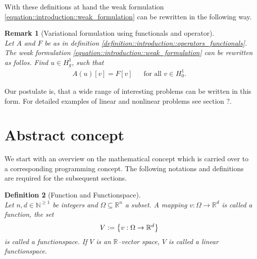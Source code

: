 \documentclass[a4paper,11pt]{article}
\numberwithin{equation}{section}
\newtheorem{definition}{Definition}[section]
\newtheorem{remark}[definition]{Remark}
\newcommand{\theoremNewline}{\hspace{1mm}\\}
\newcommand{\theoremEndLine}{\hspace{1mm}}
\newcommand{\punkt}{\text{.}}
\newcommand{\N}{\mathbb{N}}
\newcommand{\R}{\mathbb{R}}
\begin{document}
    With these definitions at hand the weak formulation \eqref{equation::introduction::weak_formulation} can be
    rewritten in the following way.

    \begin{remark}[Variational formulation using functionals and operator]\theoremNewline
      \label{remakr::introduction::variational_formulation_functionals_operators}
      Let $A$ and $F$ be as in definition \ref{definition::introduction::operators_functionals}. The weak formulation
      \eqref{equation::introduction::weak_formulation} can be rewritten as follos.
      Find ${u \in H^1_g}$, such that
      \begin{align}
        \label{equation::introduction::variational_formulation_functionals_operators}
        A(u)[v] = F[v] &&\text{for all } v\in H^1_0 \punkt
      \end{align}
    \end{remark}

    Our postulate is, that a wide range of interesting problems can be written in this form. For detailed examples of
    linear and nonlinear problems see section ?.

  \section{Abstract concept}
    \label{section::abstract_concept}

    We start with an overview on the mathematical concept which is carried over to a corresponding programming
    concept. The following notations and definitions are required for the subsequent sections.

    \begin{definition}[Function and Functionspace]\theoremNewline
      \label{definition::analytical_concept::function_functionspace}
      Let ${n,d \in \N^{\geq 1}}$ be integers and ${\Omega \subseteq \mathbb{R}^n}$ a subset. A mapping
      ${v : \Omega \rightarrow \R^d}$ is called a \textnormal{function}, the set
      \begin{align}
        V :=
          \big\{
            v : \Omega \rightarrow \R^d
          \big\}
          \notag
      \end{align}
      is called a \textnormal{functionspace}. If $V$ is an $\R$--vector space, $V$ is called a \textnormal{linear functionspace}.
    \end{definition}\theoremEndLine
\end{document}
